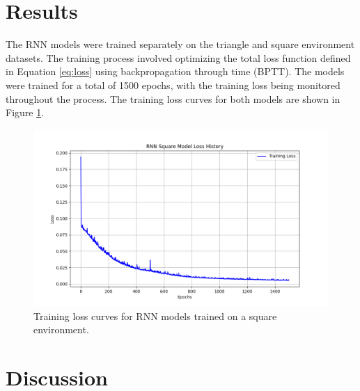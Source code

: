 \documentclass{article}
\begin{document}
\section{Results}
The RNN models were trained separately on the triangle and square environment datasets. The training process involved optimizing the total loss function defined in Equation \ref{eq:loss} using backpropagation through time (BPTT). The models were trained for a total of 1500 epochs, with the training loss being monitored throughout the process. The training loss curves for both models are shown in Figure \ref{fig:loss_curves}. 

\begin{figure}
    \centering
    \includegraphics[width=\textwidth]{figures/rnn_square_model_loss_history.png}
    \caption{Training loss curves for RNN models trained on a square environment.}
    \label{fig:loss_curves}
\end{figure}



\section{Discussion}





\end{document}

